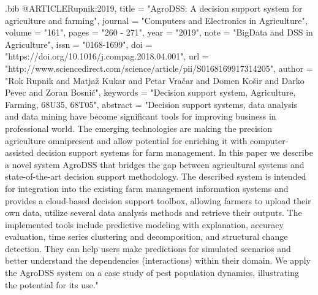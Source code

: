 \begin{filecontents}{\jobname.bib}
@ARTICLE{Rupnik:2019,
  title = "AgroDSS: A decision support system for agriculture and farming",
  journal = "Computers and Electronics in Agriculture",
  volume = "161",
  pages = "260 - 271",
  year = "2019",
  note = "BigData and DSS in Agriculture",
  issn = "0168-1699",
  doi = "https://doi.org/10.1016/j.compag.2018.04.001",
  url = "http://www.sciencedirect.com/science/article/pii/S0168169917314205",
  author = "Rok Rupnik and Matjaž Kukar and Petar Vračar and Domen Košir and Darko Pevec and Zoran Bosnić",
  keywords = "Decision support system, Agriculture, Farming, 68U35, 68T05",
  abstract = "Decision support systems, data analysis and data mining have become significant tools for improving business in professional world. The emerging technologies are making the precision agriculture omnipresent and allow potential for enriching it with computer-assisted decision support systems for farm management. In this paper we describe a novel system AgroDSS that bridges the gap between agricultural systems and state-of-the-art decision support methodology. The described system is intended for integration into the existing farm management information systems and provides a cloud-based decision support toolbox, allowing farmers to upload their own data, utilize several data analysis methods and retrieve their outputs. The implemented tools include predictive modeling with explanation, accuracy evaluation, time series clustering and decomposition, and structural change detection. They can help users make predictions for simulated scenarios and better understand the dependencies (interactions) within their domain. We apply the AgroDSS system on a case study of pest population dynamics, illustrating the potential for its use."
}


\end{filecontents}
